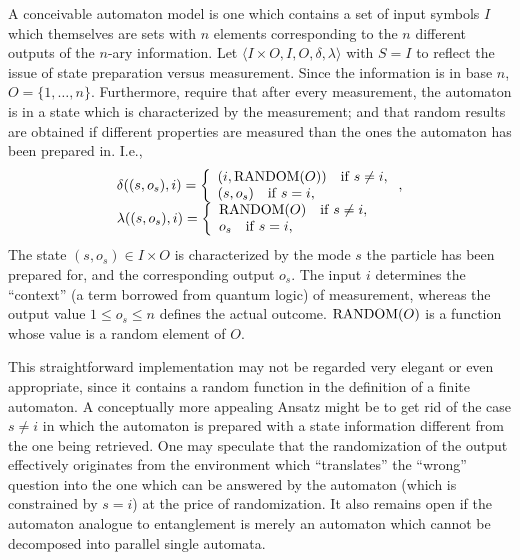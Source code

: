A conceivable automaton model is one which contains a set of input symbols $I$ which themselves
are sets with $n$ elements corresponding to the $n$ different outputs of the $n$-ary information.
Let
$\langle I\times O,I,O,\delta ,\lambda \rangle$
with $S=I$ to reflect the issue of state preparation versus measurement.
Since the information is in base $n$, $O=\{1,\ldots ,n\}$.
Furthermore, require that after every measurement, the automaton is in a state
which is characterized by the measurement; and that random results are obtained if
different properties are measured than the ones the automaton has been prepared in. I.e.,
\begin{equation}
\begin{array}{llllll}
\delta ((s,o_s),i)=\left\{
{
\begin{array}{llllll}
(i,{\rm RANDOM}(O)) \quad {\rm if}\; s\neq i,\\
 (s,o_s) \quad {\rm if}\; s = i,
\end{array}
}
\right. ,\\
\lambda ((s,o_s),i)=\left\{
{
\begin{array}{llllll}
{\rm RANDOM}(O) \quad {\rm if}\; s\neq i,\\
 o_s \quad {\rm if}\; s = i,
\end{array}
}
\right.
\end{array}
\end{equation}
The state $(s,o_s)\in I\times O$
is characterized by the mode $s$ the particle has been prepared for,
and the corresponding output $o_s$.
The input $i$ determines the ``context'' (a term borrowed from quantum logic)
of measurement,
whereas the output value $1\le o_s\le n$ defines the actual outcome.
${\rm RANDOM}(O)$ is a function whose value is a random element of $O$.

This straightforward implementation may not be regarded very elegant or even appropriate,
since it contains a random function in the definition of a finite automaton.
A conceptually more appealing Ansatz might be to get rid of the case $s\neq i$ in
which the automaton is prepared with a state information different from the one being retrieved.
One may speculate that the randomization of the output effectively originates from the
environment which ``translates'' the ``wrong'' question into the one which can be
answered by the automaton (which is constrained by $s=i$) at the price of randomization.
It also remains open if the automaton analogue to entanglement is merely an automaton
which cannot be decomposed into parallel single automata.


